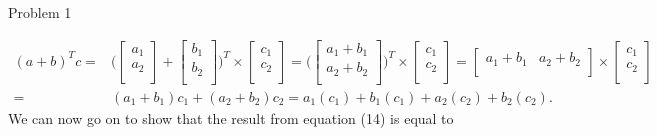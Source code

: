\begin{problem}{Problem 1}
\begin{highlight}
        \begin{align}
            (a + b)^{T}c = & \Bigg(
            \begin{bmatrix}
                a_{1} \\
                a_{2} \\
            \end{bmatrix}
            + 
            \begin{bmatrix}
                b_{1} \\
                b_{2} \\
            \end{bmatrix}
            \Bigg)^{T} \times
            \begin{bmatrix}
                c_{1} \\
                c_{2} \\
            \end{bmatrix}
            = \Bigg(
            \begin{bmatrix}
                a_{1} + b_{1} \\
                a_{2} + b_{2} \\
            \end{bmatrix}
            \Bigg)^{T} \times
            \begin{bmatrix}
                c_{1} \\
                c_{2} \\
            \end{bmatrix}
            = 
            \begin{bmatrix}
                a_{1} + b_{1} & a_{2} + b_{2} \\
            \end{bmatrix}
            \times 
            \begin{bmatrix}
                c_{1} \\
                c_{2} \\
            \end{bmatrix} \\
            = & (a_{1} + b_{1})c_{1} + (a_{2} + b_{2})c_{2} = a_{1}(c_{1}) + b_{1}(c_{1}) + a_{2}(c_{2}) + b_{2}(c_{2}).
        \end{align}
        We can now go on to show that the result from equation (14) is equal to


\end{highlight}
\end{problem}
